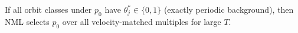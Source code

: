 \begin{theorem}\label{thm:ident}
If all orbit classes under $p_0$ have $\theta_j^* \in \{0,1\}$ (exactly periodic background), then NML selects $p_0$ over all velocity-matched multiples for large $T$.
\end{theorem}
